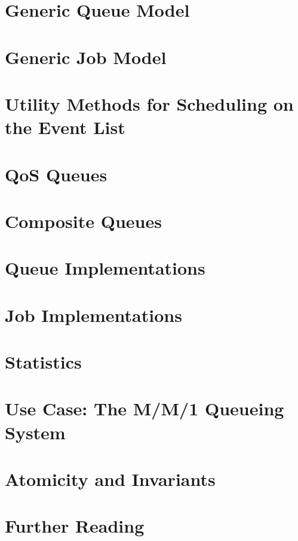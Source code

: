 \documentclass[12pt]{book}
\begin{document}
\chapter{Generic Queue Model}
\label{chap:generic-queue-model}


\chapter{Generic Job Model}
\label{chap:generic-job-model}


\chapter{Utility Methods for Scheduling on the Event List}
\label{chap:utility-scheduling}


\chapter{QoS Queues}
\label{chap:qos-queues}


\chapter{Composite Queues}
\label{chap:composite-queues}


\chapter{Queue Implementations}
\label{chap:queue-implementations}


\chapter{Job Implementations}
\label{chap:job-implementations}


\chapter{Statistics}
\label{chap:statistics}


\chapter{Use Case: The M/M/1 Queueing System}
\label{chap:m-m-1}


\chapter{Atomicity and Invariants}
\label{chap:atomicity-invariants}


\chapter{Further Reading}
\label{chap:further-reading}


{}

\end{document}
